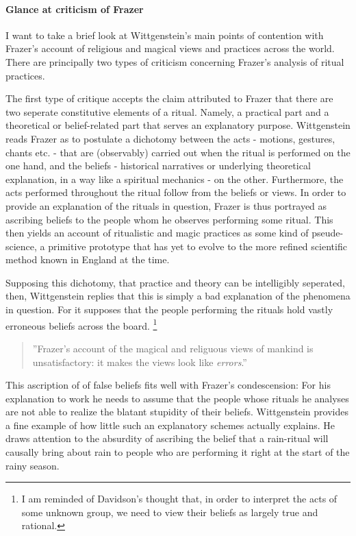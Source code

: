 \documentclass{article}
\begin{document}
\paragraph{Glance at criticism of Frazer}
I want to take a brief look at Wittgenstein's main points of contention with Frazer's account of religious and magical views and practices across the world. There are principally two types of criticism concerning Frazer's analysis of ritual practices. 

The first type of critique accepts the claim attributed to Frazer that there are two seperate constitutive elements of a ritual. Namely, a practical part and a theoretical or belief-related part that serves an explanatory purpose. Wittgenstein reads Frazer as to postulate a dichotomy between the acts - motions, gestures, chants etc. - that are (observably) carried out when the ritual is performed on the one hand, and the beliefs - historical narratives or underlying theoretical explanation, in a way like a spiritual mechanics - on the other. Furthermore, the acts performed throughout the ritual follow from the beliefs or views. In order to provide an explanation of the rituals in question, Frazer is thus portrayed as ascribing beliefs to the people whom he observes performing some ritual. This then yields an account of ritualistic and magic practices as some kind of pseude-science, a primitive prototype that has yet to evolve to the more refined scientific method known in England at the time. 

Supposing this dichotomy, that practice and theory can be intelligibly seperated, then, Wittgenstein replies that this is simply a bad explanation of the phenomena in question. For it supposes that the people performing the rituals hold vastly erroneous beliefs across the board. \footnote{I am reminded of Davidson's thought that, in order to interpret the acts of some unknown group, we need to view their beliefs as largely true and rational.}
\begin{quote}
''Frazer's account of the magical and religuous views of mankind is unsatisfactory: it makes the views look like \textit{errors}.''
\end{quote} 
This ascription of of false beliefs fits well with Frazer's condescension: For his explanation to work he needs to assume that the people whose rituals he analyses are not able to realize the blatant stupidity of their beliefs. Wittgenstein provides a fine example of how little such an explanatory schemes actually explains. He draws attention to the absurdity of ascribing the belief that a rain-ritual will causally bring about rain to people who are performing it right at the start of the rainy season.
\end{document}
